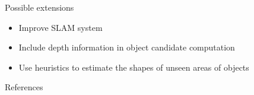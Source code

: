 \documentclass[final]{beamer}
\newlength{\onecolwid}
\newlength{\twocolwid}
\begin{document}
\begin{frame}[t]
\begin{columns}[t]
\begin{column}{\twocolwid}
\begin{columns}[t,totalwidth=\twocolwid]
	\begin{column}{\onecolwid}






		\begin{block}{Possible extensions}
			
		\begin{itemize}
			\item Improve SLAM system
			\item Include depth information in object candidate computation
			\item Use heuristics to estimate the shapes of unseen areas of objects
		\end{itemize}

		\end{block}


		\begin{block}{References}

		\small{
		\vspace{0.75in}}

		\end{block}
		
	\end{column}	


\end{columns}
\end{column}
\end{columns}
\end{frame}
\end{document}
